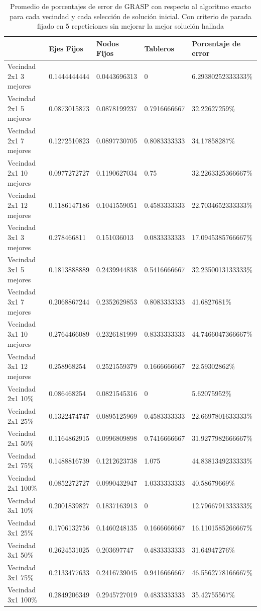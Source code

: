 \begin{table}[h!]
	\begin{tabular}[c]{|l|l|l|l|l|}
	\hline & Ejes Fijos & Nodos Fijos & Tableros & Porcentaje de error \\
	\hline Vecindad 2x1 3 mejores & 0.1444444444 & 0.0443696313 & 0 & 6.29380252333333\% \\
	\hline Vecindad 2x1 5 mejores & 0.0873015873 & 0.0878199237 & 0.7916666667 & 32.22627259\% \\
	\hline Vecindad 2x1 7 mejores & 0.1272510823 & 0.0897730705 & 0.8083333333 & 34.17858287\% \\
	\hline Vecindad 2x1 10 mejores & 0.0977272727 & 0.1190627034 & 0.75 & 32.2263325366667\% \\
	\hline Vecindad 2x1 12 mejores & 0.1186147186 & 0.1041559051 & 0.4583333333 & 22.7034652333333\% \\
	\hline Vecindad 3x1 3 mejores & 0.278466811 & 0.151036013 & 0.0833333333 & 17.0945385766667\% \\
	\hline Vecindad 3x1 5 mejores & 0.1813888889 & 0.2439944838 & 0.5416666667 & 32.2350013133333\% \\
	\hline Vecindad 3x1 7 mejores & 0.2068867244 & 0.2352629853 & 0.8083333333 & 41.6827681\% \\
	\hline Vecindad 3x1 10 mejores & 0.2764466089 & 0.2326181999 & 0.8333333333 & 44.7466047366667\% \\
	\hline Vecindad 3x1 12 mejores & 0.258968254 & 0.2521559379 & 0.1666666667 & 22.59302862\% \\
	\hline Vecindad 2x1 10\% & 0.086468254 & 0.0821545316 & 0 & 5.62075952\% \\
	\hline Vecindad 2x1 25\% & 0.1322474747 & 0.0895125969 & 0.4583333333 & 22.6697801633333\% \\
	\hline Vecindad 2x1 50\% & 0.1164862915 & 0.0996809898 & 0.7416666667 & 31.9277982666667\% \\
	\hline Vecindad 2x1 75\% & 0.1488816739 & 0.1212623738 & 1.075 & 44.8381349233333\% \\
	\hline Vecindad 2x1 100\% & 0.0852272727 & 0.0990432947 & 1.0333333333 & 40.58679669\% \\
	\hline Vecindad 3x1 10\% & 0.2001839827 & 0.1837163913 & 0 & 12.7966791333333\% \\
	\hline Vecindad 3x1 25\% & 0.1706132756 & 0.1460248135 & 0.1666666667 & 16.1101585266667\% \\
	\hline Vecindad 3x1 50\% & 0.2624531025 & 0.203697747 & 0.4833333333 & 31.64947276\% \\
	\hline Vecindad 3x1 75\% & 0.2133477633 & 0.2416739045 & 0.9416666667 & 46.5562778166667\% \\
	\hline Vecindad 3x1 100\% & 0.2849206349 & 0.2945727019 & 0.4833333333 & 35.42755567\% \\
	\hline
	\end{tabular}
\caption{Promedio de porcentajes de error de GRASP con respecto al algoritmo exacto para cada vecindad y cada selecci\'on de soluci\'on inicial. Con criterio de parada fijado en 5 repeticiones sin mejorar la mejor soluci\'on hallada}
\end{table}
 
